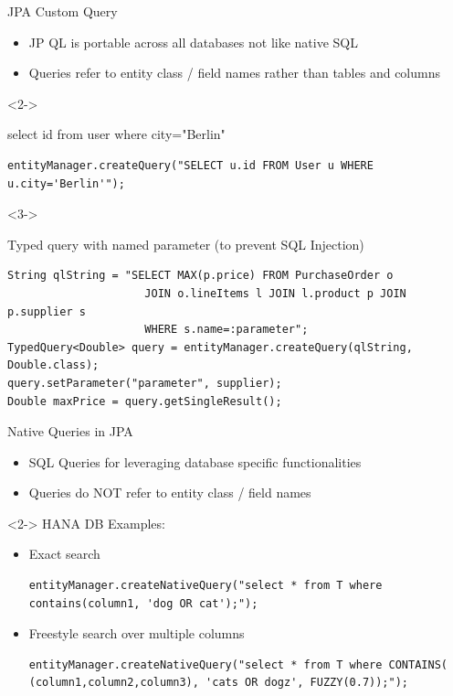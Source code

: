 \begin{frame}[fragile]{JPA Custom Query}
\begin{itemize}
\item JP QL is portable across all databases not like native SQL
\item Queries refer to entity class / field names rather than tables and columns
\end{itemize}
\vfill
{}
  \begin{itemize}
\begin{visibleenv}<2->
	\item select id from user where city="Berlin"
		\begin{lstlisting}
entityManager.createQuery("SELECT u.id FROM User u WHERE u.city='Berlin'");
		\end{lstlisting}
\end{visibleenv}
\begin{visibleenv}<3->
	\item Typed query with named parameter (to prevent SQL Injection)
	\begin{lstlisting}
String qlString = "SELECT MAX(p.price) FROM PurchaseOrder o
                     JOIN o.lineItems l JOIN l.product p JOIN p.supplier s 
                     WHERE s.name=:parameter";
TypedQuery<Double> query = entityManager.createQuery(qlString, Double.class);
query.setParameter("parameter", supplier);
Double maxPrice = query.getSingleResult();
	\end{lstlisting}

\end{visibleenv}
\end{itemize}

\end{frame}

\begin{frame}[fragile]{Native Queries in JPA}
\begin{itemize}
\item SQL Queries for leveraging database specific functionalities
\item Queries do NOT refer to entity class / field names
\end{itemize}
\vfill
\begin{visibleenv}<2->
HANA DB Examples:
  \begin{itemize}
	\item Exact search
		\begin{lstlisting}
entityManager.createNativeQuery("select * from T where contains(column1, 'dog OR cat');");
		\end{lstlisting}
	\item Freestyle search over multiple columns
		\begin{lstlisting}
entityManager.createNativeQuery("select * from T where CONTAINS( (column1,column2,column3), 'cats OR dogz', FUZZY(0.7));");
		\end{lstlisting}
  \end{itemize}
\end{visibleenv}
\end{frame}

